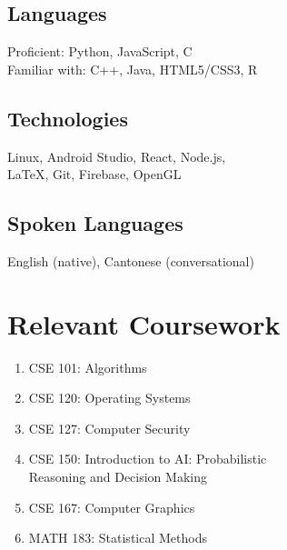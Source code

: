 \documentclass{article}
\begin{document}
\begin{paracol}{2}
\vspace{-0.5em}
\subsection{Languages} \hfill
	
	Proficient: Python, JavaScript, C\\
	\indent Familiar with: C++, Java, HTML5/CSS3, R
\vspace{-0.5em}
\subsection{Technologies} \hfill

	Linux, Android Studio, React, Node.js, \\\indent LaTeX, Git, Firebase, OpenGL
	
\vspace{-0.5em}
\subsection{Spoken Languages} \hfill

	English (native), Cantonese (conversational)
	
\section{Relevant Coursework}
\begin{enumerate}[leftmargin=0cm]
	\item[] CSE 101: Algorithms
	\item[] CSE 120: Operating Systems
	\item[] CSE 127: Computer Security
	\item[] CSE 150: Introduction to AI: Probabilistic\\Reasoning and Decision Making 
	\item[] CSE 167: Computer Graphics
	\item[] MATH 183: Statistical Methods
\end{enumerate}

\end{paracol}
\end{document}
